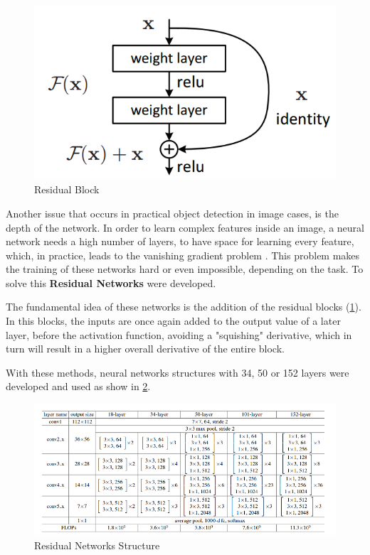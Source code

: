  \begin{figure}[H]
	\includegraphics[width=\textwidth]{Pictures/007SkipConnection.png}
	\caption{Residual Block \cite{ResNetPaper}}
	\label{SkipConnection}
\end{figure}

Another issue that occurs in practical object detection in image cases, is the depth of the network. In order to learn complex features inside an image, a neural network needs a high number of layers, to have space for learning every feature, which, in practice, leads to the vanishing gradient problem \cite{ResNetPaper}. This problem makes the training of these networks hard or even impossible, depending on the task. To solve this \textbf{Residual Networks} \cite{ResNetPaper} were developed.

The fundamental idea of these networks is the addition of the residual blocks (\ref{SkipConnection}). In this blocks, the inputs are once again added to the output value of a later layer, before the activation function, avoiding a "squishing" derivative, which in turn will result in a higher overall derivative of the entire block.

With these methods, neural networks structures with 34, 50 or 152 layers were developed and used as show in \ref{ResNetExample}.

 \begin{figure}[H]
	\includegraphics[width=\textwidth]{Pictures/008ResNetExample.png}
	\caption{Residual Networks Structure \cite{ResNetPaper}}
	\label{ResNetExample}
\end{figure}

